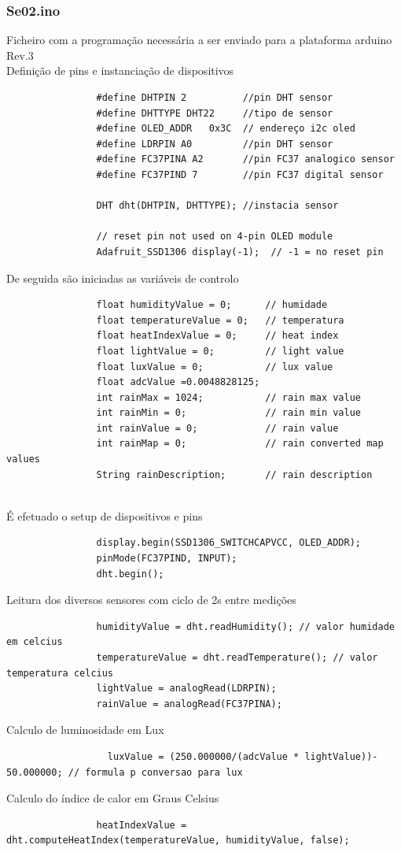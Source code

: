 \documentclass[12pt,a4paper,portrait]{article}
\begin{document}
	
	
			\subsubsection{Se02.ino}
			Ficheiro com a programação necessária a ser enviado para a plataforma arduino Rev.3\\
			
			Definição de pins e instanciação de dispositivos 
				\lstset{escapechar=@,style=customc}
				\begin{lstlisting}
				#define DHTPIN 2          //pin DHT sensor 
				#define DHTTYPE DHT22     //tipo de sensor
				#define OLED_ADDR   0x3C  // endereço i2c oled
				#define LDRPIN A0         //pin DHT sensor
				#define FC37PINA A2       //pin FC37 analogico sensor
				#define FC37PIND 7        //pin FC37 digital sensor 
				
				DHT dht(DHTPIN, DHTTYPE); //instacia sensor
				
				// reset pin not used on 4-pin OLED module
				Adafruit_SSD1306 display(-1);  // -1 = no reset pin
				\end{lstlisting}
				\newpage
				De seguida são iniciadas as variáveis de controlo
				\lstset{escapechar=@,style=customc}
				\begin{lstlisting}
				float humidityValue = 0;      // humidade
				float temperatureValue = 0;   // temperatura
				float heatIndexValue = 0;     // heat index
				float lightValue = 0;         // light value
				float luxValue = 0;           // lux value
				float adcValue =0.0048828125;
				int rainMax = 1024;           // rain max value
				int rainMin = 0;              // rain min value
				int rainValue = 0;            // rain value
				int rainMap = 0;              // rain converted map values
				String rainDescription;       // rain description
				
				\end{lstlisting}
				É efetuado o setup de dispositivos e pins
				\lstset{escapechar=@,style=customc}
				\begin{lstlisting}
				display.begin(SSD1306_SWITCHCAPVCC, OLED_ADDR);
				pinMode(FC37PIND, INPUT);
				dht.begin();
				\end{lstlisting}
				Leitura dos diversos sensores com ciclo de 2s entre medições
				\lstset{escapechar=@,style=customc}
				\begin{lstlisting}
				humidityValue = dht.readHumidity(); // valor humidade em celcius
				temperatureValue = dht.readTemperature(); // valor temperatura celcius 
				lightValue = analogRead(LDRPIN);
				rainValue = analogRead(FC37PINA);
				\end{lstlisting}
				Calculo de luminosidade em Lux
				\lstset{escapechar=@,style=customc}
				\begin{lstlisting}
				  luxValue = (250.000000/(adcValue * lightValue))- 50.000000; // formula p conversao para lux
				\end{lstlisting}
				Calculo do índice de calor em Graus Celsius
				\lstset{escapechar=@,style=customc}
				\begin{lstlisting}
				heatIndexValue = dht.computeHeatIndex(temperatureValue, humidityValue, false);
				\end{lstlisting}
\end{document}
